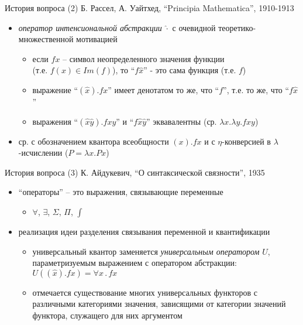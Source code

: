 \documentclass{beamer}
\begin{document}
\begin{frame}{История вопроса (2)}
Б. Рассел, А. Уайтхед, ``Principia Mathematica'', 1910-1913
\bigskip
\begin{itemize}
    \item \textit{оператор интенсиональной абстракции} $\hat{\cdot}$ с очевидной теоретико-множественной мотивацией
    \medskip
    \begin{itemize}
        \item если $fx$ -- символ неопределенного значения функции\\(т.е. $f(x) \in Im(f)$), то ``$f\hat{x}$'' - это сама функция (т.е. $f$)
        \medskip
        \item выражение ``$(\hat{x}).fx$'' имеет денотатом то же, что ``$f$'', т.е. то же, что ``$f\hat{x}$''
        \medskip
        \item выражения ``$(\hat{x}\hat{y}).fxy$'' и ``$f\hat{x}\hat{y}$'' эквавалентны (ср. $\lambda x.\lambda y.fxy$)
    \end{itemize}
    \medskip
    \item ср. с обозначением квантора всеобщности $(x).fx$ и с $\eta$-конверсией в $\lambda$-исчислении ($P = \lambda x . Px$)
\end{itemize}
\bigskip

\end{frame}

\begin{frame}{История вопроса (3)}
К. Айдукевич, ``О синтаксической связности'', 1935
\bigskip
\begin{itemize}
	\item ``операторы'' -- это выражения, связывающие переменные 
	\medskip
	    \begin{itemize}
	        \item $\forall$, $\exists$, $\Sigma$, $\Pi$, $\int$
	    \end{itemize}
    \medskip
	\item реализация идеи разделения связывания переменной и квантификации
	    \medskip
	    \begin{itemize}
	        \item универсальный квантор заменяется \textit{универсальным оператором} $U$, параметризуемым выражением с оператором абстракции: $U((\hat{x}).fx) = \forall x \, . \, fx$
	        \medskip
	        \item отмечается существование многих универсальных функторов с различными категориями значения, зависящими от категории значений функтора, служащего для них аргументом
	    \end{itemize}
\end{itemize}
\end{frame}
\end{document}
